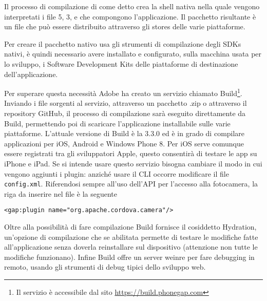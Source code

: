             Il processo di compilazione di \pg{} come detto
            crea la shell nativa nella quale vengono interpretati i file
            \html{}5, \css{}3, e
            \js{} che compongono l'applicazione. Il pacchetto
            risultante è un file che può essere distribuito attraverso gli stores
            delle varie piattaforme.

            Per creare il pacchetto nativo \pg{} usa gli strumenti di compilazione
            degli SDKs nativi, è quindi necessario avere installato e configurato,
            sulla macchina
            usata per lo sviluppo, i Software Development Kits delle piattaforme
            di destinazione dell'applicazione.

            Per superare questa necessità Adobe ha creato un servizio chiamato
            \pg{} Build\footnote{Il servizio è accessibile dal sito
            \url{https://build.phonegap.com}}.
            Inviando i file sorgenti al servizio, attraverso un
            pacchetto .zip o attraverso il repository GitHub, il processo di
            compilazione sarà eseguito direttamente da \pg{} Build, permettendo
            poi di scaricare l'applicazione installabile sulle varie piattaforme.
            L'attuale versione di \pg{} Build è la 3.3.0 ed è in grado di compilare
            applicazioni per iOS, Android e Windows Phone 8. Per iOS serve comunque
            essere registrati tra gli sviluppatori Apple, questo consentirà di
            testare le app su iPhone e iPad.
            Se si intende usare questo servizio bisogna cambiare il modo in cui
            vengono aggiunti i plugin: anziché usare il CLI occorre modificare
            il file \verb|config.xml|. Riferendosi sempre all'uso dell'API per
            l'accesso alla fotocamera, la riga da inserire nel file è la seguente
    \begin{lstlisting}[]
  <gap:plugin name="org.apache.cordova.camera"/>
    \end{lstlisting}

            Oltre alla possibilità di fare compilazione \pg{} Build fornisce
            il cosiddetto Hydration, un'opzione di compilazione che se abilitata
            permette di testare le modifiche fatte all'applicazione senza doverla
            reinstallare sul dispositivo (attenzione non tutte le modifiche
            funzionano). Infine \pg{} Build offre un server weinre per fare
            debugging in remoto, usando gli strumenti di debug tipici dello
            sviluppo web.

